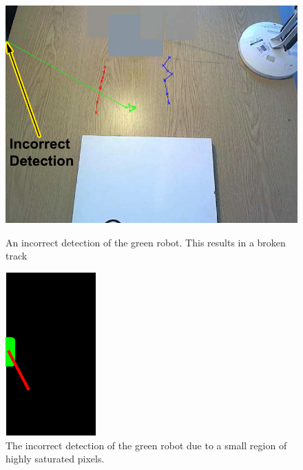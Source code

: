 \documentclass{article}
\begin{document}
\begin{figure}[h!]
\begin{minipage}[b]{0.5\linewidth}
\includegraphics[scale=0.5]{../Drawings/incorrectdetBackdata7.pdf}
\caption{An incorrect detection of the green robot. This results in a broken track}
\label{fig:InDetectData7}
\end{minipage}
\hspace{0.5cm}
\begin{minipage}[b]{0.5\linewidth}
\includegraphics[scale=0.8]{../Drawings/incorrectdetrobotdata7.pdf}
\caption{The incorrect detection of the green robot due to a small region of highly saturated pixels. }
\label{fig:greenInDetect}
\end{minipage}
\end{figure}
\end{document}
